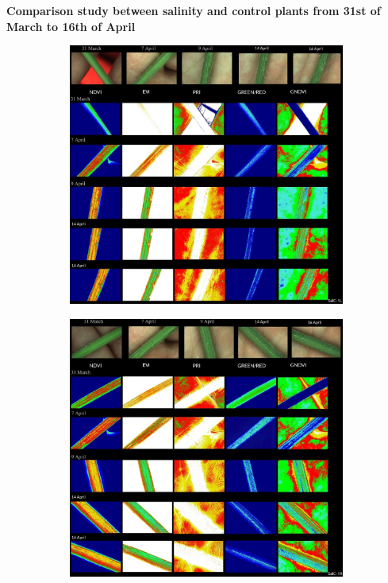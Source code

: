 \documentclass{article}
\begin{document}
{\begin{landscape}
                    \begin{center}
                        \textbf{Comparison study between salinity and control plants from 31st of March to 16th of April}
                    \end{center}
                    
                    \begin{figure}[h]
                      \centering
                      \begin{subfigure}[b]{0.72\textwidth}
                        \includegraphics[width=\textwidth,height=0.5\textheight]{Figures/SalC1L.png}
                      \end{subfigure}
                      \qquad
                      \begin{subfigure}[b]{0.72\textwidth}
                        \includegraphics[width=\textwidth,height=0.5\textheight]{Figures/SalC1R.png}

\end{subfigure}
\end{figure}
\end{landscape}}
\end{document}
